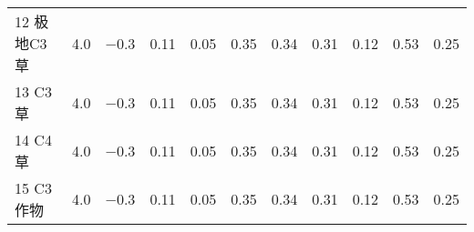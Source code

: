 \begin{landscape}
\begin{table}[htbp]
\begin{tabular}{@{}lcccccccccc@{}}
      12 极地C3草         & 4.0              & \num { -0.3 }         & 0.11                     & 0.05                     & 0.35                     & 0.34                     & 0.31                     & 0.12                     & 0.53                     & 0.25                    \\
      13 C3草             & 4.0              & \num { -0.3 }         & 0.11                     & 0.05                     & 0.35                     & 0.34                     & 0.31                     & 0.12                     & 0.53                     & 0.25                    \\
      14 C4草             & 4.0              & \num { -0.3 }         & 0.11                     & 0.05                     & 0.35                     & 0.34                     & 0.31                     & 0.12                     & 0.53                     & 0.25                    \\
      15 C3作物           & 4.0              & \num { -0.3 }         & 0.11                     & 0.05                     & 0.35                     & 0.34                     & 0.31                     & 0.12                     & 0.53                     & 0.25                    \\ \bottomrule
    \end{tabular}
  \end{table}
\end{landscape}

